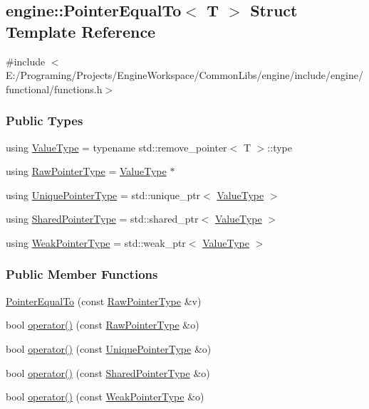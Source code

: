 \hypertarget{a00062}{}\subsection{engine\+:\+:Pointer\+Equal\+To$<$ T $>$ Struct Template Reference}
\label{a00062}


{\ttfamily \#include $<$E\+:/\+Programing/\+Projects/\+Engine\+Workspace/\+Common\+Libs/engine/include/engine/functional/functions.\+h$>$}

\subsubsection*{Public Types}
\begin{DoxyCompactItemize}
\item 
using \hyperlink{a00062_af485b6182246602f97c4f0bef182f799}{Value\+Type} = typename std\+::remove\+\_\+pointer$<$ T $>$\+::type
\item 
using \hyperlink{a00062_accdf0f2f7684859c103e277bc745f869}{Raw\+Pointer\+Type} = \hyperlink{a00062_af485b6182246602f97c4f0bef182f799}{Value\+Type} $\ast$
\item 
using \hyperlink{a00062_ad16a216e6217ae2f08c95f03fdd245cc}{Unique\+Pointer\+Type} = std\+::unique\+\_\+ptr$<$ \hyperlink{a00062_af485b6182246602f97c4f0bef182f799}{Value\+Type} $>$
\item 
using \hyperlink{a00062_a30718c9509a5f19766f8d867ddd08011}{Shared\+Pointer\+Type} = std\+::shared\+\_\+ptr$<$ \hyperlink{a00062_af485b6182246602f97c4f0bef182f799}{Value\+Type} $>$
\item 
using \hyperlink{a00062_ac6a2979606d67d0c973d3f73e7730651}{Weak\+Pointer\+Type} = std\+::weak\+\_\+ptr$<$ \hyperlink{a00062_af485b6182246602f97c4f0bef182f799}{Value\+Type} $>$
\end{DoxyCompactItemize}
\subsubsection*{Public Member Functions}
\begin{DoxyCompactItemize}
\item 
\hyperlink{a00062_a25356ec570fd1f0c1395c2ea7dcdc839}{Pointer\+Equal\+To} (const \hyperlink{a00062_accdf0f2f7684859c103e277bc745f869}{Raw\+Pointer\+Type} \&v)
\item 
bool \hyperlink{a00062_aa95f53dfe2393421d25b5bf6f458cb53}{operator()} (const \hyperlink{a00062_accdf0f2f7684859c103e277bc745f869}{Raw\+Pointer\+Type} \&o)
\item 
bool \hyperlink{a00062_abc68beffa9e32f7dd0caff6ce3d36e84}{operator()} (const \hyperlink{a00062_ad16a216e6217ae2f08c95f03fdd245cc}{Unique\+Pointer\+Type} \&o)
\item 
bool \hyperlink{a00062_a5183273e9ba9a58234466b34adac373c}{operator()} (const \hyperlink{a00062_a30718c9509a5f19766f8d867ddd08011}{Shared\+Pointer\+Type} \&o)
\item 
bool \hyperlink{a00062_acdb87526d0e9c0aa8d235bf2e6cc5e97}{operator()} (const \hyperlink{a00062_ac6a2979606d67d0c973d3f73e7730651}{Weak\+Pointer\+Type} \&o)
\end{DoxyCompactItemize}



